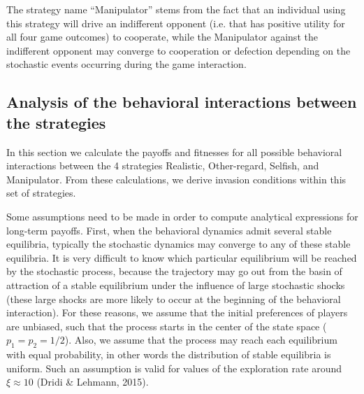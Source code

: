 \documentclass[11pt,reqno]{amsart}
\newcommand{\p}{p}
\newcommand{\xr}{\xi}
\begin{document}
The strategy name ``Manipulator'' stems from the fact that an individual using this strategy will drive an indifferent opponent (i.e. that has positive utility for all four game outcomes) to cooperate, while the Manipulator against the indifferent opponent may converge to cooperation or defection depending on the stochastic events occurring during the game interaction.



\subsection{Analysis of the behavioral interactions between the strategies}

In this section we calculate the payoffs and fitnesses for all possible behavioral interactions between the 4 strategies Realistic, Other-regard, Selfish, and Manipulator. From these calculations, we derive invasion conditions within this set of strategies.

Some assumptions need to be made in order to compute analytical expressions for long-term payoffs. First, when the behavioral dynamics admit several stable equilibria, typically the stochastic dynamics may converge to any of these stable equilibria. It is very difficult to know which particular equilibrium will be reached by the stochastic process, because the trajectory may go out from the basin of attraction of a stable equilibrium under the influence of large stochastic shocks (these large shocks are more likely to occur at the beginning of the behavioral interaction). For these reasons, we assume that the initial preferences of players are unbiased, such that the process starts in the center of the state space ($\p_1 = \p_2 = 1/2$). Also, we assume that the process may reach each equilibrium with equal probability, in other words the distribution of stable equilibria is uniform. Such an assumption is valid for values of the exploration rate around $\xr\approx 10$ (Dridi \& Lehmann, 2015).
\end{document}
